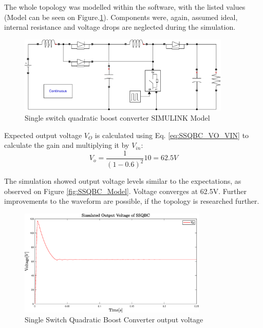 The whole topology was modelled within the software, with the listed values (Model can be seen on Figure.\ref{fig:Model_SSQBC}). Components were, again, assumed ideal, internal resistance and voltage drops are neglected during the simulation. 

\begin{figure} [H]
   \centering
   \includegraphics[width=0.9\textwidth]{figures/cSingleSwitchQuadraticBC/Model_SSQBC.pdf}
    \caption{Single switch quadratic boost converter SIMULINK Model}
	\label{fig:Model_SSQBC}
\end{figure}

Expected output voltage $V_O$ is calculated using Eq. \ref{eq:SSQBC_VO_VIN} to calculate the gain and multiplying it by $V_{in}$: 
\begin{equation}
	{V_o}= \frac{1}{(1-0.6)^2}10=62.5V
	\label{eq:Simulation_SSQBC}
\end{equation}

The simulation showed output voltage levels similar to the expectations, as observed on Figure \ref{fig:SSQBC_Model}. Voltage converges at 62.5V. Further improvements to the waveform are possible, if the topology is researched further. 

\begin{figure} [H]
   \centering
   \includegraphics[width=0.8\textwidth]{figures/cSingleSwitchQuadraticBC/Simulation_SSQBC.eps}
    \caption{Single Switch Quadratic Boost Converter output voltage}
	\label{fig:SSQBC_Result}
\end{figure}
\clearpage